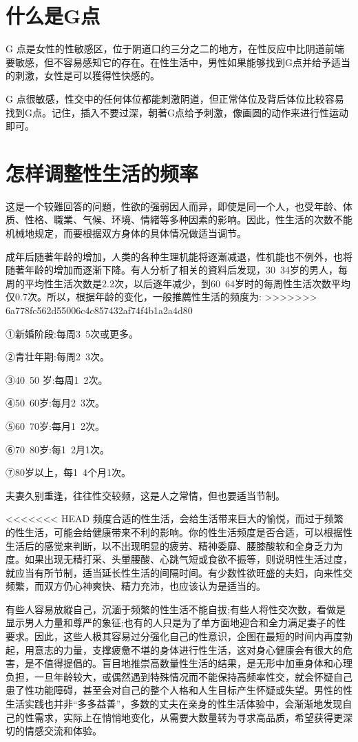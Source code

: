 \documentclass[12pt,UTF8]{ctexbook}
\begin{document}
\section{什么是G点}

G 点是女性的性敏感区，位于阴道口约三分之二的地方，在性反应中比阴道前端要敏感，但不容易感知它的存在。在性生活中，男性如果能够找到G点并给予适当的刺激，女性是可以獲得性快感的。

G 点很敏感，性交中的任何体位都能刺激阴道，但正常体位及背后体位比较容易找到G点。记住，插入不要过深，朝著G点给予刺激，像画圆的动作来进行性运动即可。

\section{怎样调整性生活的频率}

这是一个较難回答的问題，性欲的强弱因人而异，即使是同一个人，也受年龄、体质、性格、職業、气候、环境、情緒等多种因素的影响。因此，性生活的次数不能机械地规定，而要根据双方身体的具体情况做适当调节。

成年后随著年龄的增加，人类的各种生理机能将逐漸减退，性机能也不例外，也将随著年龄的增加而逐渐下降。有人分析了相关的資料后发现，30~34岁的男人，每周的平均性生活次数是2.2次，以后逐年减少，到60~64岁时的每周性生活次数平均仅0.7次。所以，根据年龄的变化，一般推薦性生活的频度为:
>>>>>>> 6a778fc562d55006c4c857432af74f4b1a2a4d80

①新婚阶段:每周3~5次或更多。

②青壮年期:每周2~3次。

③40~50 岁:每周1~2次。

④50~60岁:每月2~3次。

⑤60~70岁:每月1~2次。

⑥70~80岁:每1~2月1次。

⑦80岁以上，每1~4个月1次。

夫妻久别重逢，往往性交较频，这是人之常情，但也要适当节制。

<<<<<<< HEAD
频度合适的性生活，会给生活带来巨大的愉悦，而过于频繁的性生活，可能会给健康带来不利的影响。你的性生活频度是否合适，可以根据性生活后的感觉来判断，以不出现明显的疲劳、精神委靡、腰膝酸软和全身乏力为度。如果出现无精打采、头暈腰酸、心跳气短或食欲不振等，则说明性生活过度，就应当有所节制，适当延长性生活的间隔时间。有少数性欲旺盛的夫妇，向来性交频繁，而双方仍心神爽快、精力充沛，也应该认为是适当的。

有些人容易放縱自己，沉湎于频繁的性生活不能自拔;有些人将性交次数，看做是显示男人力量和尊严的象征;也有的人只是为了单方面地迎合和全力满足妻子的性要求。因此，这些人极其容易过分强化自己的性意识，企图在最短的时间内再度勃起，用意志的力量，支撑疲惫不堪的身体进行性生活，这对身心健康会有很大的危害，是不值得提倡的。盲目地推崇高数量性生活的结果，是无形中加重身体和心理负担，一旦年龄较大，或偶然遇到特殊情况而不能保持高频率性交，就会怀疑自己患了性功能障碍，甚至会对自己的整个人格和人生目标产生怀疑或失望。男性的性生活实践也并非“多多益善”，多数的丈夫在亲身的性生活体验中，会渐渐地发现自己的性需求，实际上在悄悄地变化，从需要大数量转为寻求高品质，希望获得更深切的情感交流和体验。
\end{document}
